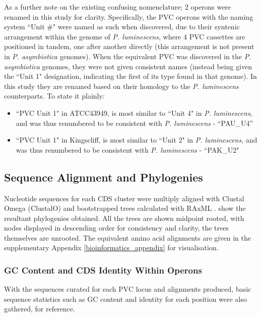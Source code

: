 As a further note on the existing confusing nomenclature; 2 operons were renamed in this study for clarity. Specifically, the PVC operons with the naming system ``Unit \#" were named as such when discovered, due to their syntenic arrangement within the genome of \emph{P. luminescens}, where 4 PVC cassettes are positioned in tandem, one after another directly (this arrangement is not present in \emph{P. asymbiotica} genomes). When the equivalent PVC was discovered in the \emph{P. asymbiotica} genomes, they were not given consistent names (instead being given the ``Unit 1" designation, indicating the first of its type found in that genome). In this study they are renamed based on their homology to the \emph{P. luminescens} counterparts. To state it plainly:

\begin{itemize}
	\item ``PVC Unit 1" in \Pa{} ATCC43949, is most similar to ``Unit 4" in \emph{P. luminescens}, and was thus renumbered to be consistent with \emph{P. luminescens} - ``PAU\_U4''
	\item ``PVC Unit  1" in \Pa{} Kingscliff, is most similar to ``Unit 2" in \emph{P. luminescens}, and was thus renumbered to be consistent with \emph{P. luminescens} - ``PAK\_U2"
\end{itemize}

\subsection{Sequence Alignment and Phylogenies}
	Nucleotide sequences for each CDS cluster were multiply aligned with Clustal Omega (ClustalO) \citep{Sievers2011} and bootstrapped trees calculated with RAxML \citep{Stamatakis2014}.  show the resultant phylogenies obtained. All the trees are shown midpoint rooted, with nodes displayed in descending order for consistency and clarity, the trees themselves are unrooted. The equivalent amino acid alignments are given in the supplementary Appendix \vref{bioinformatics_appendix} for visualisation.

\subsubsection{GC Content and CDS Identity Within Operons}
With the sequences curated for each PVC locus and alignments produced, basic sequence statistics such as GC content and identity for each position were also gathered, for reference. 

